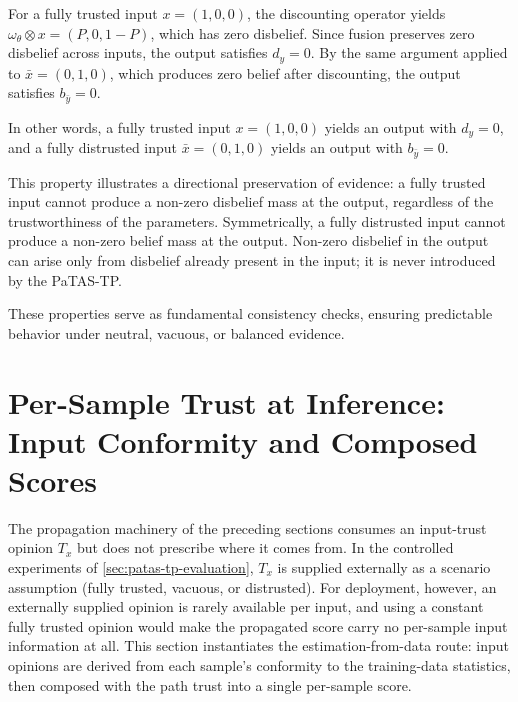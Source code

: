 \begin{remark}\label{rem:directional}
For a fully trusted input $x = (1,0,0)$, the discounting operator yields $\omega_\theta \otimes x = (P, 0, 1-P)$, which has zero disbelief. Since fusion preserves zero disbelief across inputs, the output satisfies $d_y = 0$. By the same argument applied to $\bar{x} = (0,1,0)$, which produces zero belief after discounting, the output satisfies $b_{\bar{y}} = 0$. 

In other words, a fully trusted input $x = (1,0,0)$ yields an output with $d_y = 0$, and a fully distrusted input $\bar{x} = (0,1,0)$ yields an output with $b_{\bar{y}} = 0$. 

This property illustrates a directional preservation of evidence: a fully trusted input cannot produce a non-zero disbelief mass at the output, regardless of the trustworthiness of the parameters. Symmetrically, a fully distrusted input cannot produce a non-zero belief mass at the output. Non-zero disbelief in the output can arise only from disbelief already present in the input; it is never introduced by the \ac{PaTAS-TP}.
\end{remark}

These properties serve as fundamental consistency checks, ensuring predictable behavior under neutral, vacuous, or balanced evidence.


\section{Per-Sample Trust at Inference: Input Conformity and Composed Scores}
\label{sec:inference-trust}

The propagation machinery of the preceding sections consumes an input-trust opinion $T_x$ but does not prescribe where it comes from. In the controlled experiments of \cref{sec:patas-tp-evaluation}, $T_x$ is supplied externally as a scenario assumption (fully trusted, vacuous, or distrusted). For deployment, however, an externally supplied opinion is rarely available per input, and using a constant fully trusted opinion would make the propagated score carry no per-sample input information at all. This section instantiates the estimation-from-data route: input opinions are derived from each sample's conformity to the training-data statistics, then composed with the path trust into a single per-sample score.

